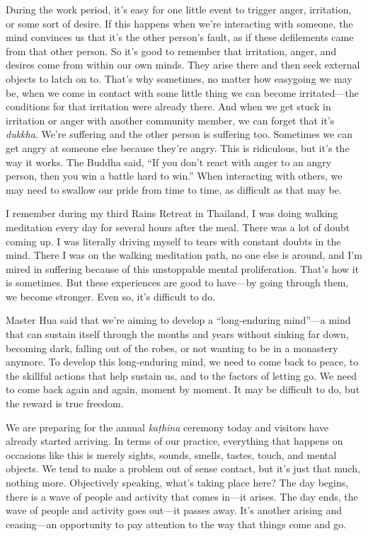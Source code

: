 During the work period, it's easy for one little event to trigger 
anger, irritation, or some sort of desire. If this happens when we're 
interacting with someone, the mind convinces us that it's the other 
person's fault, as if these defilements came from that other person. So 
it's good to remember that irritation, anger, and desires come from 
within our own minds. They arise there and then seek external objects 
to latch on to. That's why sometimes, no matter how easygoing we may 
be, when we come in contact with some little thing we can become 
irritated---the conditions for that irritation were already there. And 
when we get stuck in irritation or anger with another community member, 
we can forget that it's \emph{dukkha}. We're suffering and the other 
person is suffering too. Sometimes we can get angry at someone else 
because they're angry. This is ridiculous, but it's the way it works. 
The Buddha said, ``If you don't react with anger to an angry person, 
then you win a battle hard to win.'' When interacting with others, we 
may need to swallow our pride from time to time, as difficult as that 
may be.

I remember during my third Rains Retreat in Thailand, I was doing 
walking meditation every day for several hours after the meal. There 
was a lot of doubt coming up. I was literally driving myself to tears 
with constant doubts in the mind. There I was on the walking meditation 
path, no one else is around, and I'm mired in suffering because of this 
unstoppable mental proliferation. That's how it is sometimes. But these 
experiences are good to have---by going through them, we become 
stronger. Even so, it's difficult to do.

Master Hua said that we're aiming to develop a ``long-enduring 
mind''---a mind that can sustain itself through the months and years 
without sinking far down, becoming dark, falling out of the robes, or 
not wanting to be in a monastery anymore. To develop this long-enduring 
mind, we need to come back to peace, to the skillful actions that help 
sustain us, and to the factors of letting go. We need to come back 
again and again, moment by moment. It may be difficult to do, but the 
reward is true freedom.


We are preparing for the annual \emph{kaṭhina} ceremony today and 
visitors have already started arriving. In terms of our practice, 
everything that happens on occasions like this is merely sights, 
sounds, smells, tastes, touch, and mental objects. We tend to make a 
problem out of sense contact, but it's just that much, nothing more. 
Objectively speaking, what's taking place here? The day begins, there 
is a wave of people and activity that comes in---it arises. The day 
ends, the wave of people and activity goes out---it passes away. It's 
another arising and ceasing---an opportunity to pay attention to the 
way that things come and go.

